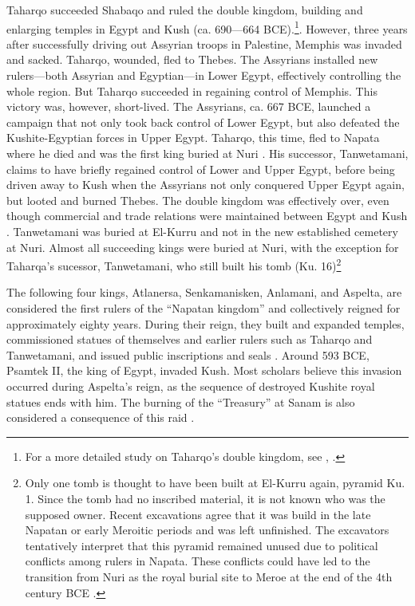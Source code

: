 Taharqo succeeded Shabaqo and ruled the double kingdom, building and enlarging temples in Egypt and Kush (ca. 690—664 BCE).\footnote{For a more detailed study on Taharqo’s double kingdom, see \cite{dalliborTaharqoPharaoAus2005}, \cite{popeDoubleKingdomTaharqo2014}.}. However, three years after successfully driving out Assyrian troops in Palestine, Memphis was invaded and sacked. Taharqo, wounded, fled to Thebes. The Assyrians installed new rulers—both Assyrian and Egyptian—in Lower Egypt, effectively controlling the whole region. But Taharqo succeeded in regaining control of Memphis. This victory was, however, short-lived. The Assyrians, ca. 667 BCE, launched a campaign that not only took back control of Lower Egypt, but also defeated the Kushite-Egyptian forces in Upper Egypt. Taharqo, this time, fled to Napata where he died and was the first king buried at Nuri \parencite[p.~145-154]{rillyHistoireSoudanOrigines2017}. His successor, Tanwetamani, claims to have briefly regained control of Lower and Upper Egypt, before being driven away to Kush when the Assyrians not only conquered Upper Egypt again, but looted and burned Thebes. The double kingdom was effectively over, even though commercial and trade relations were maintained between Egypt and Kush \parencite[p.~356-360]{torokTwoWorldsFrontier2009}. Tanwetamani was buried at El-Kurru and  not in the new established cemetery at Nuri. Almost all succeeding kings were buried at Nuri, with the exception for Taharqa’s sucessor, Tanwetamani, who still built his tomb (Ku. 16)\footnote{Only one tomb is thought to have been built at El-Kurru again, pyramid Ku. 1. Since the tomb had no inscribed material, it is not known who was the supposed owner. Recent excavations agree that it was build in the late Napatan or early Meroitic periods and was left unfinished. The excavators tentatively interpret that this pyramid remained unused due to political conflicts among rulers in Napata. These conflicts could have led to the transition from Nuri as the royal burial site to Meroe at the end of the 4th century BCE \parencites[p.~62]{emberlingExcavationPyramidKu2015}{yellinPyramidChapelDecorations2015}.}

The following four kings, Atlanersa, Senkamanisken, Anlamani, and Aspelta, are considered the first rulers of the “Napatan kingdom” and collectively reigned for approximately eighty years. During their reign, they built and expanded temples, commissioned statues of themselves and earlier rulers such as Taharqo and Tanwetamani, and issued public inscriptions and seals \parencites[p.~157-163]{rillyHistoireSoudanOrigines2017}[p.~133-137]{emberlingKushDynastyNapata2023}. Around 593 BCE, Psamtek II, the king of Egypt, invaded Kush. Most scholars believe this invasion occurred during Aspelta's reign, as the sequence of destroyed Kushite royal statues ends with him. The burning of the “Treasury” at Sanam is also considered a consequence of this raid \parencites[p.~361-362]{torokTwoWorldsFrontier2009}{andersonWhatAreThese2009}[p.~138-139]{emberlingKushDynastyNapata2023}.

